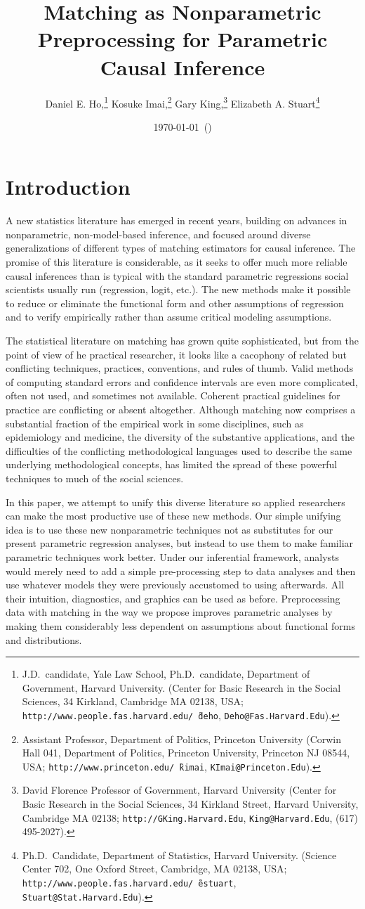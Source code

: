 \documentclass[11pt,titlepage]{article}
\title{Matching as Nonparametric Preprocessing for Parametric Causal
  Inference}
\author{Daniel E. Ho,\thanks{J.D.\ candidate, Yale Law School, Ph.D.\
    candidate, Department of Government, Harvard
    University. (Center for Basic Research in the Social Sciences, 34
    Kirkland, Cambridge MA 02138, USA;
    \texttt{http://www.people.fas.harvard.edu/\~\,deho},
    \texttt{Deho@Fas.Harvard.Edu}).}
Kosuke Imai,\thanks{Assistant Professor, Department of Politics, Princeton
    University (Corwin Hall 041, Department of Politics, Princeton
    University, Princeton NJ 08544, USA;
    \texttt{http://www.princeton.edu/\~\,kimai},
    \texttt{KImai@Princeton.Edu}).}
Gary King,\thanks{David Florence Professor of Government, Harvard
  University (Center for Basic Research in the Social Sciences, 34
  Kirkland Street, Harvard University, Cambridge MA 02138;
  \texttt{http://GKing.Harvard.Edu}, \texttt{King@Harvard.Edu}, (617)
  495-2027).}
Elizabeth A. Stuart\thanks{Ph.D.\ Candidate, Department of Statistics, Harvard
  University. (Science Center 702, One Oxford Street, Cambridge, MA
  02138, USA;
  \texttt{http://www.people.fas.harvard.edu/\~\,estuart},
  \texttt{Stuart@Stat.Harvard.Edu}).}}
\date{\today\ (\printtime)}
\begin{document}
\maketitle

\begin{abstract}

\end{abstract}

\section{Introduction}

A new statistics literature has emerged in recent years, building on
advances in nonparametric, non-model-based inference, and focused
around diverse generalizations of different types of matching
estimators for causal inference.  The promise of this literature is
considerable, as it seeks to offer much more reliable causal
inferences than is typical with the standard parametric regressions
social scientists usually run (regression, logit, etc.).  The new
methods make it possible to reduce or eliminate the functional form
and other assumptions of regression and to verify empirically rather
than assume critical modeling assumptions.

The statistical literature on matching has grown quite sophisticated,
but from the point of view of he practical researcher, it looks like a
cacophony of related but conflicting techniques, practices,
conventions, and rules of thumb.  Valid methods of computing standard
errors and confidence intervals are even more complicated, often not
used, and sometimes not available.  Coherent practical guidelines for
practice are conflicting or absent altogether.  Although matching now
comprises a substantial fraction of the empirical work in some
disciplines, such as epidemiology and medicine, the diversity of the
substantive applications, and the difficulties of the conflicting
methodological languages used to describe the same underlying
methodological concepts, has limited the spread of these powerful
techniques to much of the social sciences.

In this paper, we attempt to unify this diverse literature so applied
researchers can make the most productive use of these new methods.
Our simple unifying idea is to use these new nonparametric techniques
not as substitutes for our present parametric regression analyses, but
instead to use them to make familiar parametric techniques work
better.  Under our inferential framework, analysts would merely need
to add a simple pre-processing step to data analyses and then use
whatever models they were previously accustomed to using afterwards.
All their intuition, diagnostics, and graphics can be used as before.
Preprocessing data with matching in the way we propose improves
parametric analyses by making them considerably less dependent on
assumptions about functional forms and distributions.
\end{document}
